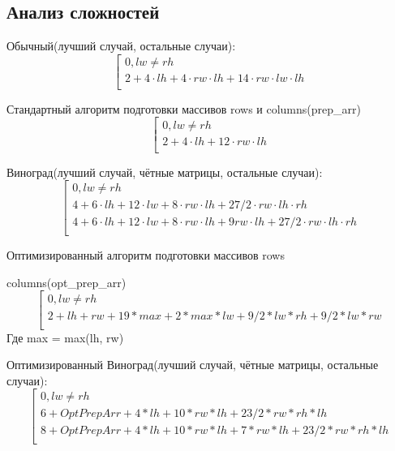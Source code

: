 \documentclass[14pt]{article}
\begin{document}
	\subsection{Анализ сложностей} 
	Обычный(лучший случай, остальные случаи):
	\begin{equation*}
		\left[ 
		\begin{gathered} 
			0, lw \neq rh \\ 
			2 + 4\cdot lh + 4\cdot rw\cdot lh+14\cdot rw\cdot lw\cdot lh \\ 
		\end{gathered} 
		\right.
	\end{equation*}
	
	Стандартный алгоритм подготовки массивов rows и columns(prep\_arr)
	\begin{equation*}
		\left[ 
		\begin{gathered} 
			0, lw \neq rh \\ 
			2 + 4\cdot lh + 12\cdot rw\cdot lh \\
		\end{gathered} 
		\right.
	\end{equation*}
	
	Виноград(лучший случай, чётные матрицы, остальные случаи):
	\begin{equation*}
		\left[ 
		\begin{gathered} 
			0, lw \neq rh \\ 
			4 + 6\cdot lh + 12\cdot lw + 8\cdot rw\cdot lh + 27/2\cdot rw\cdot lh\cdot rh \\
			4 + 6\cdot lh + 12\cdot lw + 8\cdot rw\cdot lh + 9rw\cdot lh + 27/2\cdot rw\cdot lh\cdot rh \\
		\end{gathered} 
		\right.
	\end{equation*}
	
	Оптимизированный алгоритм подготовки массивов rows
	
	 columns(opt\_prep\_arr)
	\begin{equation*}
		\left[ 
		\begin{gathered} 
			0, lw \neq rh \\ 
			2 + lh + rw + 19*max + 2*max*lw + 9/2*lw*rh + 9/2*lw*rw\\
		\end{gathered} 
		\right.
	\end{equation*}
	Где max = max(lh, rw)
	
	Оптимизированный Виноград(лучший случай, чётные матрицы, остальные случаи):
	\begin{equation*}
		\left[ 
		\begin{gathered} 
			0, lw \neq rh \\ 
			6 + OptPrepArr + 4*lh + 10*rw*lh + 23/2*rw*rh*lh \\
			8 + OptPrepArr + 4*lh + 10*rw*lh + 7*rw*lh + 23/2*rw*rh*lh \\
		\end{gathered} 
		\right.
	\end{equation*}
	
\end{document}
